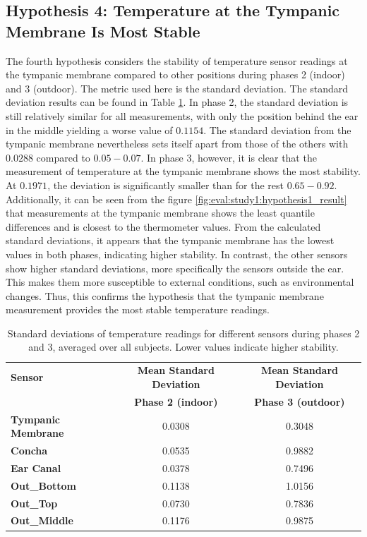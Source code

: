 \subsection{Hypothesis 4: Temperature at the Tympanic Membrane Is Most Stable}
\label{subsec:Evaluation:Study1:Hypothesis4}
The fourth hypothesis considers the stability of temperature sensor readings at the tympanic membrane compared to other positions during phases 2 (indoor) and 3 (outdoor).
The metric used here is the standard deviation. 
The standard deviation results can be found in Table \ref{subsec:Evaluation:Study1:Hypothesis4:std_dev_table}. 
In phase 2, the standard deviation is still relatively similar for all measurements, with only the position behind the ear in the middle yielding a worse value of $0.1154$. 
The standard deviation from the tympanic membrane nevertheless sets itself apart from those of the others with $0.0288$ compared to $0.05-0.07$. 
In phase 3, however, it is clear that the measurement of temperature at the tympanic membrane shows the most stability. 
At $0.1971$, the deviation is significantly smaller than for the rest $0.65-0.92$. 
Additionally, it can be seen from the figure \ref{fig:eval:study1:hypothesis1_result} that measurements at the tympanic membrane shows the least quantile differences and is closest to the thermometer values. 
From the calculated standard deviations, it appears that the tympanic membrane has the lowest values in both phases, indicating higher stability. 
In contrast, the other sensors show higher standard deviations, more specifically the sensors outside the ear. 
This makes them more susceptible to external conditions, such as environmental changes.
Thus, this confirms the hypothesis that the tympanic membrane measurement provides the most stable temperature readings.

\begin{table}[t]
\centering
\begin{tabular}{|l|c|c|}
\hline
\textbf{Sensor} & \textbf{Mean Standard Deviation} & \textbf{Mean Standard Deviation} \\
& \textbf{Phase 2 (indoor)} & \textbf{Phase 3 (outdoor)} \\
\hline
\textbf{Tympanic Membrane} & 0.0308 & 0.3048 \\
\textbf{Concha} & 0.0535 & 0.9882 \\
\textbf{Ear Canal} & 0.0378 & 0.7496 \\
\textbf{Out\_Bottom} & 0.1138 & 1.0156 \\
\textbf{Out\_Top} & 0.0730 & 0.7836 \\
\textbf{Out\_Middle} & 0.1176 & 0.9875 \\
\hline
\end{tabular}
\caption{Standard deviations of temperature readings for different sensors during phases 2 and 3, averaged over all subjects. Lower values indicate higher stability.}
\label{subsec:Evaluation:Study1:Hypothesis4:std_dev_table}
\end{table}

